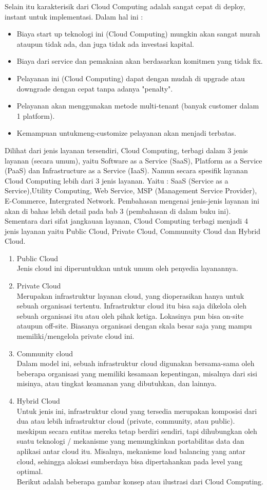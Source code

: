 \tab Selain itu karakterisik dari Cloud Computing adalah sangat cepat di deploy, instant untuk implementasi. Dalam hal ini :
\begin{itemize}
\item Biaya start up teknologi ini (Cloud Computing) mungkin akan sangat murah ataupun tidak ada, dan juga tidak ada investasi kapital.
\item Biaya dari service dan pemakaian akan berdasarkan komitmen yang tidak fix.
\item Pelayanan ini (Cloud Computing) dapat dengan mudah di upgrade atau downgrade dengan cepat tanpa adanya "penalty".
\item Pelayanan akan menggunakan metode multi-tenant (banyak customer dalam 1 platform).
\item Kemampuan untukmeng-customize pelayanan akan menjadi terbatas.
\end{itemize}
\tab Dilihat dari jenis layanan tersendiri, Cloud Computing, terbagi dalam 3 jenis layanan (secara umum), yaitu Software as a Service (SaaS), Platform as a Service (PaaS) dan Infrastructure as a Service (IaaS). Namun secara spesifik layanan Cloud Computing lebih dari 3 jenis layanan. Yaitu : SaaS (Service as a Service),Utility Computing, Web Service, MSP (Management Service Provider), E-Commerce, Intergrated Network. Pembahasan mengenai jenis-jenis layanan ini akan di bahas lebih detail pada bab 3 (pembahasan di dalam buku ini). Sementara dari sifat jangkauan layanan, Cloud Computing terbagi menjadi 4 jenis layanan yaitu Public Cloud, Private Cloud, Communuity Cloud dan Hybrid Cloud.
\begin{enumerate}
\item Public Cloud \\Jenis cloud ini diperuntukkan untuk umum oleh penyedia layanannya.
\item Private Cloud \\Merupakan infrastruktur layanan cloud, yang dioperasikan hanya untuk sebuah
organisasi tertentu. Infrastruktur cloud itu bisa saja dikelola oleh sebuah organisasi itu atau oleh pihak ketiga. Lokasinya pun bisa on-site ataupun off-site. Biasanya organisasi dengan skala besar saja yang mampu memiliki/mengelola private cloud ini.
\item Community cloud \\Dalam model ini, sebuah infrastruktur cloud digunakan bersama-sama oleh beberapa
organisasi yang memiliki kesamaan kepentingan, misalnya dari sisi misinya, atau tingkat keamanan yang dibutuhkan, dan lainnya.
\item Hybrid Cloud \\Untuk jenis ini, infrastruktur cloud yang tersedia merupakan komposisi dari dua atau lebih infrastruktur cloud (private, community, atau public). meskipun secara entitas mereka tetap berdiri sendiri, tapi dihubungkan oleh suatu teknologi / mekanisme yang memungkinkan portabilitas data dan aplikasi antar cloud itu. Misalnya, mekanisme load balancing yang antar cloud, sehingga alokasi sumberdaya bisa dipertahankan pada level yang optimal. \\Berikut adalah beberapa gambar konsep atau ilustrasi dari Cloud Computing.
\end{enumerate}
